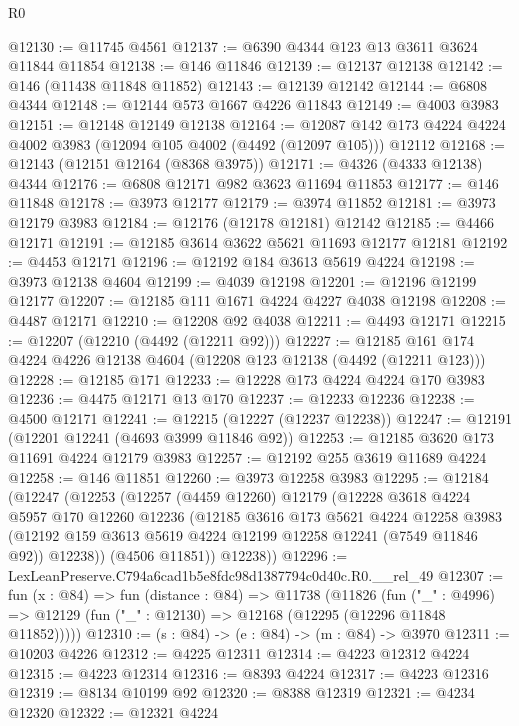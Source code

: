 \begin{lexlean}{R0}
\begin{coremodule}
@12130 := @11745 @4561
@12137 := @6390 @4344 @123 @13 @3611 @3624 @11844 @11854
@12138 := @146 @11846
@12139 := @12137 @12138
@12142 := @146 (@11438 @11848 @11852)
@12143 := @12139 @12142
@12144 := @6808 @4344
@12148 := @12144 @573 @1667 @4226 @11843
@12149 := @4003 @3983
@12151 := @12148 @12149 @12138
@12164 := @12087 @142 @173 @4224 @4224 @4002 @3983 (@12094 @105 @4002 (@4492 (@12097 @105))) @12112
@12168 := @12143 (@12151 @12164 (@8368 @3975))
@12171 := @4326 (@4333 @12138) @4344
@12176 := @6808 @12171 @982 @3623 @11694 @11853
@12177 := @146 @11848
@12178 := @3973 @12177
@12179 := @3974 @11852
@12181 := @3973 @12179 @3983
@12184 := @12176 (@12178 @12181) @12142
@12185 := @4466 @12171
@12191 := @12185 @3614 @3622 @5621 @11693 @12177 @12181
@12192 := @4453 @12171
@12196 := @12192 @184 @3613 @5619 @4224
@12198 := @3973 @12138 @4604
@12199 := @4039 @12198
@12201 := @12196 @12199 @12177
@12207 := @12185 @111 @1671 @4224 @4227 @4038 @12198
@12208 := @4487 @12171
@12210 := @12208 @92 @4038
@12211 := @4493 @12171
@12215 := @12207 (@12210 (@4492 (@12211 @92)))
@12227 := @12185 @161 @174 @4224 @4226 @12138 @4604 (@12208 @123 @12138 (@4492 (@12211 @123)))
@12228 := @12185 @171
@12233 := @12228 @173 @4224 @4224 @170 @3983
@12236 := @4475 @12171 @13 @170
@12237 := @12233 @12236
@12238 := @4500 @12171
@12241 := @12215 (@12227 (@12237 @12238))
@12247 := @12191 (@12201 @12241 (@4693 @3999 @11846 @92))
@12253 := @12185 @3620 @173 @11691 @4224 @12179 @3983
@12257 := @12192 @255 @3619 @11689 @4224
@12258 := @146 @11851
@12260 := @3973 @12258 @3983
@12295 := @12184
    (@12247
      (@12253
        (@12257
          (@4459 @12260)
          @12179
          (@12228
            @3618
            @4224
            @5957
            @170
            @12260
            @12236
            (@12185
              @3616
              @173
              @5621
              @4224
              @12258
              @3983
              (@12192 @159 @3613 @5619 @4224 @12199 @12258 @12241 (@7549 @11846 @92))
              @12238))
          (@4506 @11851))
        @12238))
@12296 := LexLeanPreserve.C794a6cad1b5e8fdc98d1387794c0d40c.R0.__rel_49
@12307 := fun (x : @84) =>
  fun (distance : @84) =>
  @11738
    (@11826
      (fun ("_" : @4996) => @12129 (fun ("_" : @12130) => @12168 (@12295 (@12296 @11848 @11852)))))
@12310 := (s : @84) -> (e : @84) -> (m : @84) -> @3970
@12311 := @10203 @4226
@12312 := @4225 @12311
@12314 := @4223 @12312 @4224
@12315 := @4223 @12314
@12316 := @8393 @4224
@12317 := @4223 @12316
@12319 := @8134 @10199 @92
@12320 := @8388 @12319
@12321 := @4234 @12320
@12322 := @12321 @4224

\end{coremodule}
\end{lexlean}
